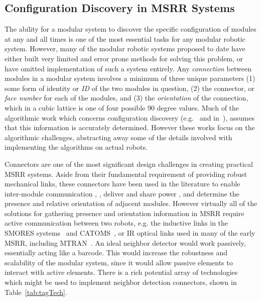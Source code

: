 \subsection{Configuration Discovery in MSRR Systems}
\label{ssec:RWconfiguration}
The ability for a modular system to discover the specific configuration of modules at any and all times is one of the most essential tasks for any modular robotic system. However, many of the modular robotic systems proposed to date have either built very limited and error prone methods for solving this problem, or have omitted implementation of such a system entirely. Any \textit{connection} between modules in a modular system involves a minimum of three unique parameters (1) some form of identity or \textit{ID} of the two modules in question, (2) the connector, or \textit{face number} for each of the modules, and (3) the \textit{orientation} of the connection, which in a cubic lattice is one of four possible 90 degree values. Much of the algorithmic work which concerns configuration discovery (e.g.~\cite{park2008automatic} and in~\cite{Funiak-IJRR09}), assumes that this information is accurately determined. However these works focus on the algorithmic challenges, abstracting away some of the details involved with implementing the algorithms on actual robots.

Connectors are one of the most significant design challenges in creating practical MSRR systems. Aside from their fundamental requirement of providing robust mechanical links, these connectors have been used in the literature to enable inter-module communication \cite{liedke2013collective}, \cite{TosunDaveyLiuYim-IROS2016}, deliver and share power \cite{OptimalPowerSharing2016}, and determine the presence and relative orientation of adjacent modules. However virtually all of the solutions for gathering presence and orientation information in MSRR require active communication between two robots, e.g. the inductive links in the SMORES systems~\cite{TosunDaveyLiuYim-IROS2016} and CATOMS~\cite{Kirby-IROS07}, or IR optical links used in many of the early MSRR, including MTRAN~\cite{Kurokawa-IJRR08}. An ideal neighbor detector would work passively, essentially acting like a barcode. This would increase the robustness and scalability of the modular system, since it would allow passive elements to interact with active elements. There is a rich potential array of technologies which might be used to implement neighbor detection connectors, shown in Table~\ref{tab:tagTech}.

